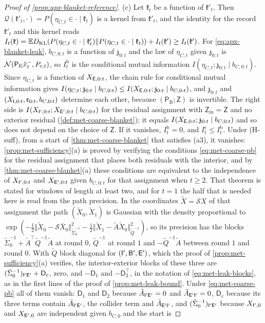 \begin{proof}[Proof of \cref{prop:apx-blanket-reference}]
(c) Let $\mathfrak k_t$ be a function of $\mathfrak k'_t$. Then $\mathcal Q(\mathfrak k'_t,\cdot)=P(\eta_{C,t}\in\cdot\mid\mathfrak k_t)$ is a kernel from $\mathfrak k'_t$, and the identity for the record $\mathfrak k'_t$ and this kernel reads $I_t(\mathfrak k)=\mathbb{E}D_{\mathrm{KL}}(P(\eta_{C,t}\in\cdot\mid\mathfrak k'_t)\Vert P(\eta_{C,t}\in\cdot\mid\mathfrak k_t))+I_t(\mathfrak k')\ge I_t(\mathfrak k')$. For \eqref{eq:apx-blanket-leak}, $b_{C,0:t}$ is a function of $\mathfrak z_{0:t}$ and the law of $\eta_{C,t}$ given $\mathfrak z_{0:t}$ is $\mathcal{N}(\mathsf P_{\mathrm E}\hat x^-_t,P_{\mathrm e,t})$, so $I^{\mathrm b}_t$ is the conditional mutual information $I(\eta_{C,t};\mathfrak z_{0:t}\mid b_{C,0:t})$. Since $\eta_{C,t}$ is a function of $X_{\mathsf{E},0:t}$, the chain rule for conditional mutual information gives $I(\eta_{C,t};\mathfrak z_{0:t}\mid b_{C,0:t})\le I(X_{\mathsf{E},0:t};\mathfrak z_{0:t}\mid b_{C,0:t})$, and $\mathfrak z_{0:t}$ and $(X_{\mathsf{I},0:t},\mathfrak r_{0:t},b_{C,0:t})$ determine each other, because $(\mathsf P_{\mathrm B};\mathsf Z)$ is invertible. The right side is $I(X_{\mathsf{I}',0:t};X_{\mathsf{E}',0:t}\mid b_{C,0:t})$ for the residual assignment with $\mathsf Z_{\mathrm{in}}=\mathsf Z$ and no exterior residual (\cref{def:met-coarse-blanket}); it equals $I(X_{\mathsf{E},0:t};\mathfrak z_{0:t}\mid b_{C,0:t})$ and so does not depend on the choice of $\mathsf Z$. If it vanishes, $I^{\mathrm b}_t=0$, and $I^{\mathrm c}_t\le I^{\mathrm b}_t$. Under (H-suff), from a start of \cref{thm:met-coarse-blanket} that satisfies (a3), it vanishes: \cref{prop:met-sufficiency}(a) is proved by verifying the conditions \eqref{eq:met-coarse-pb} for the residual assignment that places both residuals with the interior, and by \cref{thm:met-coarse-blanket}(a) these conditions are equivalent to the independence of $X_{\mathsf{I}',0:t}$ and $X_{\mathsf{E}',0:t}$ given $b_{C,0:t}$ for that assignment when $t\ge2$. That theorem is stated for windows of length at least two, and for $t=1$ the half that is needed here is read from the path precision. In the coordinates $\tilde X=\mathcal SX$ of that assignment the path $(\tilde X_0,\tilde X_1)$ is Gaussian with the density proportional to $\exp(-\frac12\Vert\tilde X_0-\mathcal S\bar X_0\Vert^2_{\tilde\Sigma_0^{-1}}-\frac12\Vert\tilde X_1-\tilde A\tilde X_0\Vert^2_{\tilde Q^{-1}})$, so its precision has the blocks $\tilde\Sigma_0^{-1}+\tilde A^\top\tilde Q^{-1}\tilde A$ at round $0$, $\tilde Q^{-1}$ at round $1$ and $-\tilde Q^{-1}\tilde A$ between round $1$ and round $0$. With $\tilde Q$ block diagonal for $(\mathsf{I}',\mathsf{B}',\mathsf{E}')$, which the proof of \cref{prop:met-sufficiency}(a) verifies, the interior-exterior blocks of these three are $(\tilde\Sigma_0^{-1})_{\mathsf{I}'\mathsf{E}'}+\mathsf D_{\mathrm c}$, zero, and $-\mathsf D_1$ and $-\mathsf D_2^\top$, in the notation of \eqref{eq:met-leak-blocks}, as in the first lines of the proof of \cref{prop:met-leak-bound}. Under \eqref{eq:met-coarse-pb} all of them vanish: $\mathsf D_1$ and $\mathsf D_2$ because $\tilde A_{\mathsf{I}'\mathsf{E}'}=0$ and $\tilde A_{\mathsf{E}'\mathsf{I}'}=0$, $\mathsf D_{\mathrm c}$ because its three terms contain $\tilde A_{\mathsf{I}'\mathsf{E}'}$, the collider term and $\tilde A_{\mathsf{E}'\mathsf{I}'}$, and $(\tilde\Sigma_0^{-1})_{\mathsf{I}'\mathsf{E}'}$ because $X_{\mathsf{I}',0}$ and $X_{\mathsf{E}',0}$ are independent given $b_{C,0}$ and the start is 
\end{proof}
